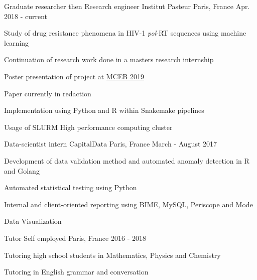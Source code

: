 

\begin{cventries}

  \cventry
    {Graduate researcher then Research engineer} %
    {Institut Pasteur} %
    {Paris, France} %
    {Apr. 2018 - current} %
    {
      \begin{cvitems} %
        \item {Study of drug resistance phenomena in HIV-1 \textit{pol}-RT sequences using machine learning}
        \item {Continuation of research work done in a masters research internship}
        \item {Poster presentation of project at \href{http://www.lirmm.fr/mceb2019/}{MCEB 2019}}
        \item {Paper currently in redaction}
        \item {Implementation using Python and R within Snakemake pipelines}
        \item {Usage of SLURM High performance computing cluster}
      \end{cvitems}
    }
    \cventry
    {Data-scientist intern} %
    {CapitalData} %
    {Paris, France} %
    {March - August 2017} %
    {
      \begin{cvitems} %
        \item {Development of data validation method and automated anomaly detection in R and Golang}
        \item {Automated statistical testing using Python}
        \item {Internal and client-oriented reporting using BIME, MySQL, Periscope and Mode}
        \item {Data Visualization}
      \end{cvitems}
    }
    \cventry
    {Tutor} %
    {Self employed} %
    {Paris, France} %
    {2016 - 2018} %
    {
      \begin{cvitems} %
        \item {Tutoring high school students in Mathematics, Physics and Chemistry}
        \item {Tutoring in English grammar and conversation}
      \end{cvitems}
    }

\end{cventries}
